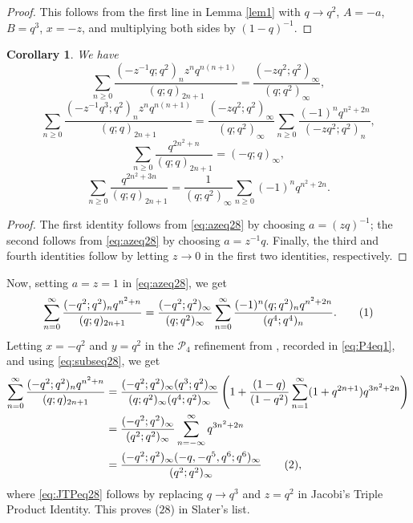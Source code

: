 \documentclass[11pt]{amsart}
\newtheorem{cor}[theorem]{Corollary}
\theoremstyle{definition}
\theoremstyle{remark}
\numberwithin{equation}{section}
\newcommand\numberthis{\addtocounter{equation}{1}\tag{\theequation}}
\begin{document}
\begin{proof}
This follows from the first line in Lemma \ref{lem1} with $q\to q^2$, $A=-a$, $B=q^{3}$, $x=-z$, and multiplying both sides by $(1-q)^{-1}$.
\end{proof}

\begin{cor}\label{cors1}
We have
\begin{equation}
\sum_{n\ge 0}\dfrac{(-z^{-1}q;q^2)_n z^n q^{n(n+1)}}{(q;q)_{2n+1}}=\dfrac{(-zq^2;q^2)_\infty}{(q;q^2)_\infty},    
\end{equation}
\begin{equation}
\sum_{n\ge 0}\dfrac{(-z^{-1}q^3;q^2)_n z^n q^{n(n+1)}}{(q;q)_{2n+1}}=\dfrac{(-zq^2;q^2)_\infty}{(q;q^2)_\infty}\sum_{n\ge 0}\dfrac{(-1)^n q^{n^2+2n}}{(-zq^2;q^2)_n},     
\end{equation}
\begin{equation}
\sum_{n\ge 0}\dfrac{q^{2n^2+n}}{(q;q)_{2n+1}}=(-q;q)_\infty,    
\end{equation}
\begin{equation}
\sum_{n\ge 0}\dfrac{q^{2n^2+3n}}{(q;q)_{2n+1}}=\dfrac{1}{(q;q^2)_\infty}\sum_{n\ge 0}(-1)^n q^{n^2+2n}.    
\end{equation}
\end{cor}
\begin{proof}
The first identity follows from \eqref{eq:azeq28} by choosing $a=(zq)^{-1}$; the second follows from \eqref{eq:azeq28} by choosing $a=z^{-1}q$. Finally, the third and fourth identities follow by letting $z\to 0$ in the first two identities, respectively.
\end{proof}
Now, setting $a = z = 1$ in \eqref{eq:azeq28}, we get
\begin{align*}
\sum\limits_{n=0}^{\infty}\frac{(-q^2;q^2)_nq^{n^2+n}}{(q;q)_{2n+1}} = \frac{(-q^2;q^2)_{\infty}}{(q;q^2)_{\infty}}\sum\limits_{n=0}^{\infty}\frac{(-1)^n(q;q^2)_nq^{n^2+2n}}{(q^4;q^4)_n}.\numberthis\label{eq:subseq28}
\end{align*}
Letting $x = -q^2$ and $y = q^2$ in the $\mathcal P_4$ refinement from \cite{DGLSIPI}, recorded in \eqref{eq:P4eq1}, and using \eqref{eq:subseq28}, we get
\begin{align*}
\sum\limits_{n=0}^{\infty}\frac{(-q^2;q^2)_nq^{n^2+n}}{(q;q)_{2n+1}} &= \frac{(-q^2;q^2)_{\infty}(q^3;q^2)_{\infty}}{(q;q^2)_{\infty}(q^4;q^2)_{\infty}}\left(1+\frac{(1-q)}{(1-q^2)}\sum\limits_{n=1}^{\infty}(1+q^{2n+1})q^{3n^2+2n}\right)\\
&= \frac{(-q^2;q^2)_{\infty}}{(q^2;q^2)_{\infty}}\sum\limits_{n=-\infty}^{\infty}q^{3n^2+2n}\\
&= \frac{(-q^2;q^2)_{\infty}(-q,-q^5,q^6;q^6)_{\infty}}{(q^2;q^2)_{\infty}}\numberthis\label{eq:JTPeq28},
\end{align*}
where \eqref{eq:JTPeq28} follows by replacing $q\rightarrow q^3$ and $z = q^2$ in Jacobi's Triple Product Identity. This proves ($28$) in Slater's list.
\end{document}
